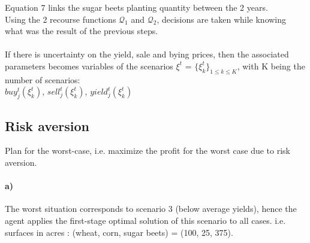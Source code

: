 \documentclass[12pt]{article}
\begin{document}
Equation 7 links the sugar beets planting quantity between the 2 years.\\
Using the 2 recourse functions $\mathcal{Q}_1$ and $\mathcal{Q}_2$, decisions are taken while knowing what was the result of the previous steps.\\\\
If there is uncertainty on the yield, sale and bying prices, then the associated parameters becomes variables of the scenarios $\xi^t$ = $\{\xi_k^t\}_{1\leq k \leq K}$, with K being the number of scenarios:\\
$buy_j^t(\xi_k^t)$, $sell_j^t(\xi_k^t)$, $yield_j^t(\xi_k^t)$

\subsection{Risk aversion}

Plan for the worst-case, i.e. maximize the profit for the worst case due to risk aversion.\\

\paragraph{a)}
The worst situation corresponds to scenario 3 (below average yields), hence the agent applies the first-stage optimal solution of this scenario to all cases.
i.e. surfaces in acres : (wheat, corn, sugar beets) = (100, 25, 375).
\end{document}
